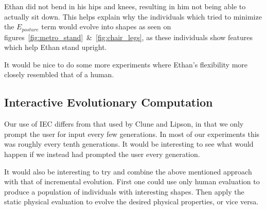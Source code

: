 Ethan did not bend in his hips and knees, resulting in him not being able to 
actually sit down. This helps explain why the individuals which tried to 
minimize the $E_{posture}$ term would evolve into shapes as seen on
figures~\ref{fig:metro_stand}~\&~\ref{fig:chair_legs}, as these individuals 
show features which help Ethan stand upright.

It would be nice to do some more experiments where Ethan's flexibility more
closely resembled that of a human.

\subsection{Interactive Evolutionary Computation}
Our use of IEC differs from that used by Clune and
Lipson\cite{Clune:2011:EOG:2078245.2078246}, in that we only prompt the user
for input every few generations. In most of our experiments this was roughly
every tenth generations. It would be interesting to see what would happen if we
instead had prompted the user every generation. 

It would also be interesting to try and combine the above mentioned approach
with that of incremental evolution. First one could use only human evaluation
to produce a population of individuals with interesting shapes. Then apply the
static physical evaluation to evolve the desired physical properties, or vice
versa.
